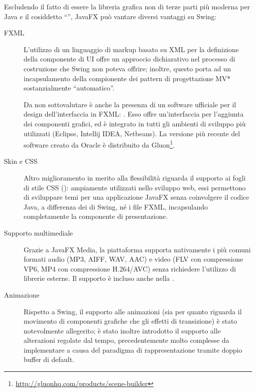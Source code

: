             Escludendo il fatto di essere la libreria grafica non di terze parti più moderna per Java e il cosiddetto ``'', JavaFX può vantare diversi vantaggi su Swing:

            \begin{description}
                \item [FXML]\label{itm:fxml} L'utilizzo di un linguaggio di markup basato su XML per la definizione della componente di UI offre un approccio dichiarativo nel processo di costruzione che Swing non poteva offrire; inoltre, questo porta ad un incapsulamento della compionente  dei pattern di progettazione MV* sostanzialmente ``automatico''.

                Da non sottovalutare è anche la presenza di un software ufficiale per il design dell'interfaccia in FXML: . Esso offre un'interfaccia  per l'aggiunta dei componenti grafici, ed è integrato in tutti gli ambienti di sviluppo più utilizzati (Eclipse, Intellij IDEA, Netbeans).
                La versione più recente del software creato da Oracle è distribuito da Gluon\footnote{\url{http://gluonhq.com/products/scene-builder}}.

                \item[Skin e CSS]\label{itm:css} Altro miglioramento in merito alla flessibilità riguarda il supporto ai fogli di stile CSS (): ampiamente utilizzati nello sviluppo web, essi permettono di sviluppare temi per una applicazione JavaFX senza coinvolgere il codice Java, a differenza dei  di Swing, né i file FXML, incapsulando completamente la componente di presentazione.

                \item[Supporto multimediale]\label{itm:media} Grazie a JavaFX Media, la piattaforma supporta nativamente i più comuni formati audio (MP3, AIFF, WAV, AAC) e video (FLV con compressione VP6, MP4 con compressione H.264/AVC) senza richiedere l'utilizzo di librerie esterne. Il supporto è incluso anche nella .

                \item[Animazione]\label{itm:anim} Rispetto a Swing, il supporto alle animazioni (sia per quanto riguarda il movimento di componenti grafiche che gli effetti di transizione) è stato notevolmente allegerito; è stato inoltre introdotto il supporto alle alterazioni regolate dal tempo, precedentemente molto complesse da implementare a causa del paradigma di rappresentazione tramite doppio buffer di default.


\end{description}
